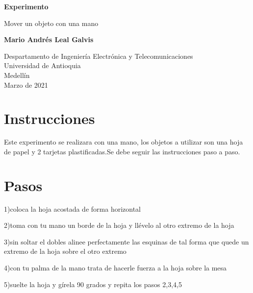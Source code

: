 \documentclass{article}
\begin{document}
\begin{titlepage}
    \begin{center}
        \vspace*{1cm}
            
        \Huge
        \textbf{Experimento}
            
        \vspace{0.5cm}
        \LARGE
        Mover un objeto con una mano
            
        \vspace{1.5cm}
            
        \textbf{Mario Andrés Leal Galvis}
            
        \vfill
            
        \vspace{0.8cm}
            
        \Large
        Despartamento de Ingeniería Electrónica y Telecomunicaciones\\
        Universidad de Antioquia\\
        Medellín\\
        Marzo de 2021
            
    \end{center}
\end{titlepage}

\tableofcontents

\section{Instrucciones}
Este experimento se realizara con una mano, los objetos a utilizar son una hoja de papel y 2 tarjetas plastificadas.Se debe seguir las instrucciones paso a paso.

\section{Pasos} \label{contenido}

1)coloca la hoja acostada de forma horizontal

2)toma con tu mano un borde de la hoja y llévelo al otro extremo de la hoja

3)sin soltar el dobles alinee perfectamente las esquinas de tal forma que quede un extremo de la hoja sobre el otro extremo

4)con tu palma de la mano trata de hacerle fuerza a la hoja sobre la mesa

5)suelte la hoja y gírela 90 grados y repita los pasos 2,3,4,5
\end{document}
